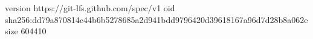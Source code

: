 version https://git-lfs.github.com/spec/v1
oid sha256:dd79a870814c44b6b5278685a2d941bdd9796420d39618167a96d7d28b8a062e
size 604410
